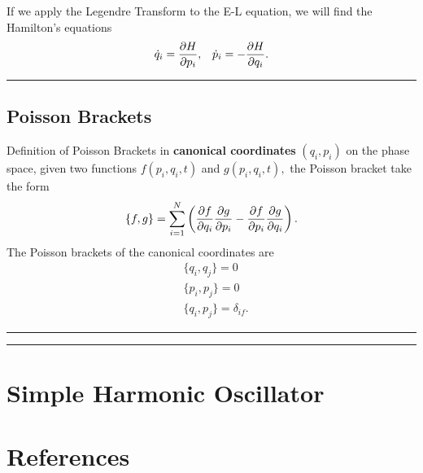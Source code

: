 \documentclass[12pt,english]{article}
\numberwithin{equation}{subsection}
\begin{document}
If we apply the Legendre Transform to the E-L equation, we will find the Hamilton's equations
\begin{align}
    \dot{q}_i = \pdv{H}{p_i}, && \dot{p}_i = -\pdv{H}{q_i}.
\end{align}
\par\noindent\rule{\textwidth}{0.4pt}
\subsection{Poisson Brackets}
Definition of Poisson Brackets in \textbf{canonical coordinates} $(q_i, p_i)$ on the phase space, given two functions $f(p_i, q_i, t)$ and $g(p_i, q_i, t),$ the Poisson bracket take the form \cite{noauthor_poissonbracket_2021}
\begin{equation}
    \{f,g\} = \sum_{i = 1}^{N} \left(\pdv{f}{q_i}\pdv{g}{p_i}-\pdv{f}{p_i}\pdv{g}{q_i}\right).
\end{equation}
The Poisson brackets of the canonical coordinates are 
\begin{align*}
    &\{q_i,q_j\}=0\\
    &\{p_i,p_j\}=0\\
    &\{q_i,p_j\}=\delta_{if}.
\end{align*}


\par\noindent\rule{\textwidth}{0.4pt}
\par\noindent\rule{\textwidth}{0.4pt}
\section{Simple Harmonic Oscillator}




\newpage
\section*{References}
\printbibliography[heading = none]
\end{document}

